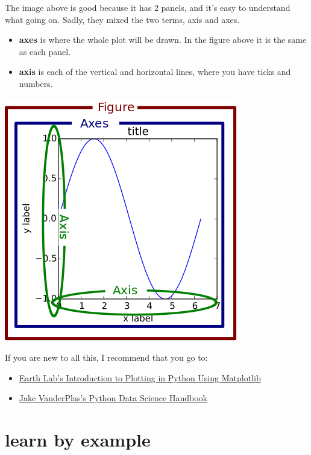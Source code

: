 \documentclass[
  letterpaper,
  DIV=11,
  numbers=noendperiod]{scrreprt}
\providecommand{\tightlist}{%
  \setlength{\itemsep}{0pt}\setlength{\parskip}{0pt}}\usepackage{longtable,booktabs,array}
\begin{document}
The image above is good because it has 2 panels, and it's easy to
understand what going on. Sadly, they mixed the two terms, axis and
axes.

\begin{itemize}
\tightlist
\item
  \textbf{axes} is where the whole plot will be drawn. In the figure
  above it is the same as each panel.
\item
  \textbf{axis} is each of the vertical and horizontal lines, where you
  have ticks and numbers.
\end{itemize}

\includegraphics{basics/axis-vs-axes.png}

If you are new to all this, I recommend that you go to:

\begin{itemize}
\tightlist
\item
  \href{https://www.earthdatascience.org/courses/scientists-guide-to-plotting-data-in-python/plot-with-matplotlib/introduction-to-matplotlib-plots/}{Earth
  Lab's Introduction to Plotting in Python Using Matplotlib}
\item
  \href{https://jakevdp.github.io/PythonDataScienceHandbook/index.html}{Jake
  VanderPlas's Python Data Science Handbook}
\end{itemize}

\chapter{learn by example}\label{learn-by-example}
\end{document}
